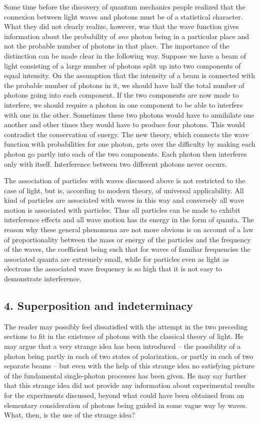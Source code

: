 Some time before the discovery of quantum mechanics people realized that the connexion between light waves and photons must be of a statistical character.  What they did not clearly realize, however, was that the wave function gives information about the probability of \emph{one} photon being in a particular place and not the probable number of photons in that place.  The importance of the distinction can be made clear in the following way.  Suppose we have a beam of light consisting of a large number of photons split up into two components of equal intensity.  On the assumption that the intensity of a beam is connected with the probable number of photons in it, we should have half the total number of photons going into each component.  If the two components are now made to interfere, we should require a photon in one component to be able to interfere with one in the other.  Sometimes these two photons would have to annihilate one another and other times they would have to produce four photons.  This would contradict the conservation of energy.  The new theory, which connects the wave function with probabilities for one photon, gets over the difficulty by making each photon go partly into each of the two components.  Each photon then interferes only with itself.  Interference between two different photons never occurs.

\label{s:dirac_partwave} The association of particles with waves discussed above is not restricted to the case of light, but is, according to modern theory, of universal applicability.  All kind of particles are associated with waves in this way and conversely all wave motion is associated with particles.  Thus all particles can be made to exhibit interference effects and all wave motion has its energy in the form of quanta.  The reason why these general phenomena are not more obvious is on account of a law of proportionality between the mass or energy of the particles and the frequency of the waves, the coefficient being such that for waves of familiar frequencies the associated quanta are extremely small, while for particles even as light as electrons the associated wave frequency is so high that it is not easy to demonstrate interference.

\subsection{4. Superposition and indeterminacy}

The reader may possibly feel dissatisfied with the attempt in the two preceding sections to fit in the existence of photons with the classical theory of light.  He may argue that a very strange idea has been introduced -- the possibility of a photon being partly in each of two states of polarization, or partly in each of two separate beams -- but even with the help of this strange idea no satisfying picture of the fundamental single-photon processes has been given.  He may say further that this strange idea did not provide any information about experimental results for the experiments discussed, beyond what could have been obtained from an elementary consideration of photons being guided in some vague way by waves.  What, then, is the use of the strange idea?


